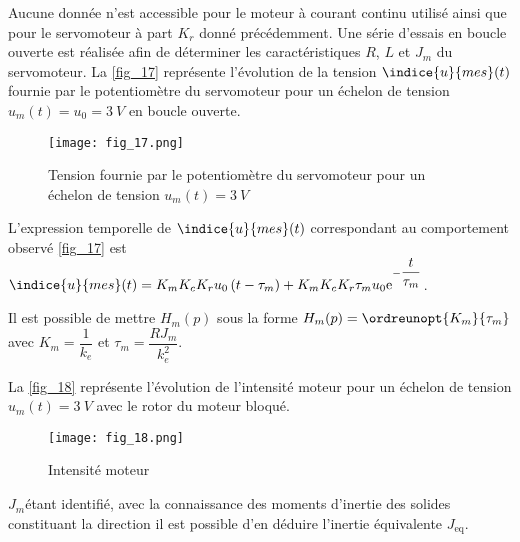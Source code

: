 Aucune donnée n’est accessible pour le moteur à courant continu utilisé ainsi que pour le servomoteur à part
$K_r$ donné précédemment. Une série d’essais en boucle ouverte est réalisée afin de déterminer les caractéristiques $R$, $L$ et $J_m$ du servomoteur.
La \autoref{fig_17} représente l’évolution de la tension $\indice{u}{mes}(t)$ fournie par le potentiomètre du servomoteur pour un échelon de tension $u_m(t) = u_0 = \SI{3}{V}$ en boucle ouverte.

\begin{figure}[H]
\centering
\texttt{[image: fig\_17.png]}
\caption{Tension fournie par le potentiomètre du servomoteur pour un échelon de tension $u_m(t)=\SI{3}{V}$ \label{fig_17}}
\end{figure}

L’expression temporelle de $\indice{u}{mes}(t)$ correspondant au comportement observé \autoref{fig_17} est
$\indice{u}{mes}(t) = K_m K_c K_r u_0\left(t-\tau_m\right)+K_m K_c K_r\tau_m u_0 \text{e}^{-\dfrac{t}{\tau_m}}$.

Il est possible de mettre $H_m(p)$ sous la forme $H_m(p) = \ordreunopt{K_m}{\tau_m}$
avec $K_m = \dfrac{1}{k_e}$ et $\tau_m =\dfrac{R J_m}{k_e^2}$.



La \autoref{fig_18} représente l’évolution de l’intensité moteur pour un échelon de tension $u_m(t)=\SI{3}{V}$ avec le rotor du moteur bloqué.

\begin{figure}[H]
\centering
\texttt{[image: fig\_18.png]}
\caption{Intensité moteur\label{fig_18}}
\end{figure}



$J_m$étant identifié, avec la connaissance des moments d’inertie des solides constituant la direction il est possible
d’en déduire l’inertie équivalente $J_{\text{eq}}$.

